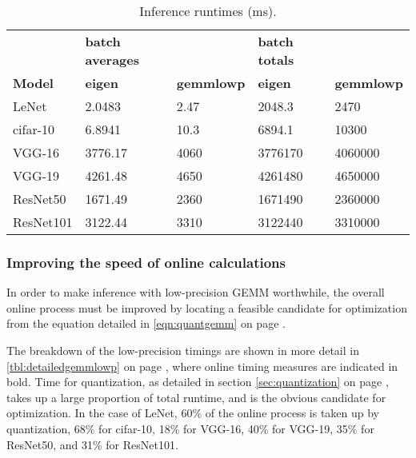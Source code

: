\begin{table}[]
\centering
\caption[Inference runtimes]{Inference runtimes (ms).}
\label{tbl:runtime}
\begin{tabular}{lllll}
& \textbf{batch averages}   &                              & \textbf{batch totals}     &     \\
\textbf{Model} & \textbf{eigen} & \textbf{gemmlowp} & \textbf{eigen} & \textbf{gemmlowp} \\
LeNet          & 2.0483         & 2.47              & 2048.3         & 2470              \\
cifar-10       & 6.8941         & 10.3              & 6894.1         & 10300             \\
VGG-16         & 3776.17        & 4060              & 3776170        & 4060000           \\
VGG-19        & 4261.48        & 4650              & 4261480        & 4650000           \\
ResNet50       & 1671.49        & 2360              & 1671490        & 2360000           \\
ResNet101      & 3122.44        & 3310              & 3122440        & 3310000          
\end{tabular}
\end{table}

\subsubsection{Improving the speed of online calculations}
In order to make inference with low-precision GEMM worthwhile, the overall online process must be improved by locating a feasible candidate for optimization from the equation detailed in \ref{eqn:quantgemm} on page \pageref{eqn:quantgemm}.

The breakdown of the low-precision timings are shown in more detail in \ref{tbl:detailedgemmlowp} on page \pageref{tbl:detailedgemmlowp}, where online timing measures are indicated in bold. Time for quantization, as detailed in section \ref{sec:quantization} on page \pageref{sec:quantization}, takes up a large proportion of total runtime, and is the obvious candidate for optimization. In the case of LeNet, 60\% of the online process is taken up by quantization, 68\% for cifar-10, 18\% for VGG-16, 40\% for VGG-19, 35\% for ResNet50, and 31\% for ResNet101.   

